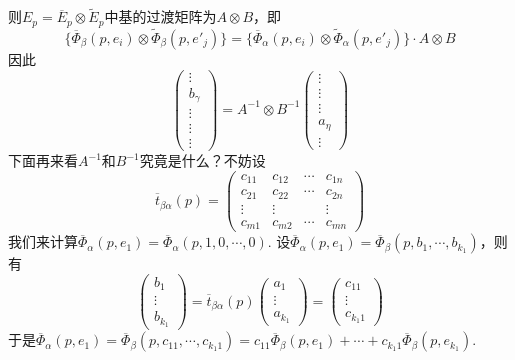 则$E_{p}=\overline{E}_{p}\otimes \tilde{E}_{p}$中基的过渡矩阵为$A\otimes B$，即
\[
\{\overline{\varPhi}_{\beta}(p,e_{i})\otimes \tilde{\varPhi}_{\beta}(p,e'_{j})\}=\{\overline{\varPhi}_{\alpha}(p,e_{i})\otimes \tilde{\varPhi}_{\alpha}(p,e'_{j})\}\cdot A\otimes B
\]
因此
\[
\left( \begin{array}{ccccc}{\vdots} \\ {b_{\gamma}}  \\ {\vdots} \\ {\vdots}\\ {\vdots}\end{array}\right)=A^{-1}\otimes B^{-1}\left( \begin{array}{ccccc}{\vdots} \\ {\vdots}  \\ {\vdots} \\ {a_{\eta}}\\ {\vdots}\end{array}\right)
\]
下面再来看$A^{-1}$和$B^{-1}$究竟是什么？不妨设
\[
\overline{t}_{\beta\alpha}(p)=\left( \begin{array}{cccc}{c_{11}} & {c_{12}} & {\cdots} & {c_{1 n}} \\ {c_{21}} & {c_{22}} & {\cdots} & {c_{2 n}} \\ {\vdots} & {\vdots} & { } & {\vdots} \\ {c_{m 1}} & {c_{m 2}} & {\cdots} & {c_{m n}}\end{array}\right)
\]
我们来计算$\overline{\varPhi}_{\alpha}(p,e_{1})=\overline{\varPhi}_{\alpha}(p,1,0,\cdots,0)$. 设$\overline{\varPhi}_{\alpha}(p,e_{1})=\overline{\varPhi}_{\beta}(p,b_{1},\cdots,b_{k_{1}})$，则有
\[
\left( \begin{array}{ccc}{b_{1}} \\ {\vdots}  \\ {b_{k_{1}}} \end{array}\right)=\overline{t}_{\beta\alpha}(p) \left( \begin{array}{ccc}{a_{1}} \\ {\vdots}  \\ {a_{k_{1}}} \end{array}\right)=\left( \begin{array}{ccc}{c_{11}} \\ {\vdots}  \\ {c_{k_{1}1}} \end{array}\right)
\]
于是$\overline{\varPhi}_{\alpha}(p,e_{1})=\overline{\varPhi}_{\beta}(p,c_{11},\cdots,c_{k_{1}1})=c_{11}\overline{\varPhi}_{\beta}(p,e_{1})+\cdots+c_{k_{1}1}\overline{\varPhi}_{\beta}(p,e_{k_{1}})$.
